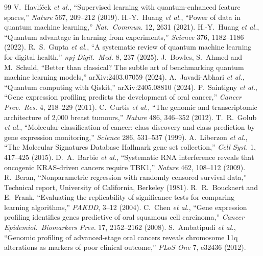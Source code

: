 \documentclass[11pt,a4paper]{article}
\begin{document}
\begin{thebibliography}{99}\small
{} V.~Havl\'{i}\v{c}ek \emph{et al.}, ``Supervised learning with quantum-enhanced feature spaces,'' \emph{Nature} 567, 209--212 (2019).
 H.-Y.~Huang \emph{et al.}, ``Power of data in quantum machine learning,'' \emph{Nat.\ Commun.} 12, 2631 (2021).
 H.-Y.~Huang \emph{et al.}, ``Quantum advantage in learning from experiments,'' \emph{Science} 376, 1182--1186 (2022).
 R.~S.~Gupta \emph{et al.}, ``A systematic review of quantum machine learning for digital health,'' \emph{npj Digit.\ Med.} 8, 237 (2025).
 J.~Bowles, S.~Ahmed and M.~Schuld, ``Better than classical? The subtle art of benchmarking quantum machine learning models,'' arXiv:2403.07059 (2024).
 A.~Javadi-Abhari \emph{et al.}, ``Quantum computing with Qiskit,'' arXiv:2405.08810 (2024).
 P.~Saintigny \emph{et al.}, ``Gene expression profiling predicts the development of oral cancer,'' \emph{Cancer Prev.\ Res.} 4, 218--229 (2011).
 C.~Curtis \emph{et al.}, ``The genomic and transcriptomic architecture of 2,000 breast tumours,'' \emph{Nature} 486, 346--352 (2012).
 T.~R.~Golub \emph{et al.}, ``Molecular classification of cancer: class discovery and class prediction by gene expression monitoring,'' \emph{Science} 286, 531--537 (1999).
 A.~Liberzon \emph{et al.}, ``The Molecular Signatures Database Hallmark gene set collection,'' \emph{Cell Syst.} 1, 417--425 (2015).
 D.~A.~Barbie \emph{et al.}, ``Systematic RNA interference reveals that oncogenic KRAS-driven cancers require TBK1,'' \emph{Nature} 462, 108--112 (2009).
 R.~Beran, ``Nonparametric regression with randomly censored survival data,'' Technical report, University of California, Berkeley (1981).
 R.~R.~Bouckaert and E.~Frank, ``Evaluating the replicability of significance tests for comparing learning algorithms,'' \emph{PAKDD}, 3--12 (2004).
 C.~Chen \emph{et al.}, ``Gene expression profiling identifies genes predictive of oral squamous cell carcinoma,'' \emph{Cancer Epidemiol.\ Biomarkers Prev.} 17, 2152--2162 (2008).
 S.~Ambatipudi \emph{et al.}, ``Genomic profiling of advanced-stage oral cancers reveals chromosome 11q alterations as markers of poor clinical outcome,'' \emph{PLoS One} 7, e32436 (2012).
\end{thebibliography}
\end{document}
